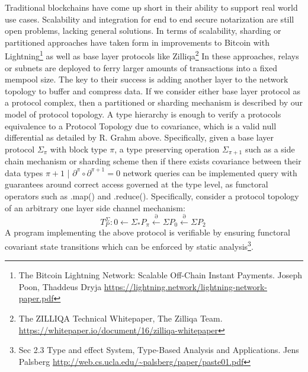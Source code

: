 \documentclass{article}
\begin{document}
Traditional blockchains have come up short in their ability to support real world use cases. Scalability and integration for end to end secure notarization are still open problems, lacking general solutions. In terms of scalability, sharding or partitioned approaches have taken form in improvements to Bitcoin with Lightning\footnote{The Bitcoin Lightning Network:
Scalable Off-Chain Instant Payments. Joseph Poon, Thaddeus Dryja \url{https://lightning.network/lightning-network-paper.pdf}} as well as base layer protocols like Zilliqa\footnote{The ZILLIQA Technical Whitepaper, The Zilliqa Team. \url{https://whitepaper.io/document/16/zilliqa-whitepaper}} In these approaches, relays or subnets are deployed to ferry larger amounts of transactions into a fixed mempool size. The key to their success is adding another layer to the network topology to buffer and compress data. If we consider either base layer protocol as a protocol complex, then a partitioned or sharding mechanism is described by our model of protocol topology. A type hierarchy is enough to verify a protocols equivalence to a Protocol Topology due to covariance, which is a valid null differential as detailed by R. Grahm above. Specifically, given a base layer protocol $\Sigma_\pi$ with block type $\pi$, a type preserving operation $\Sigma_{\pi+1}$ such as a side chain mechanism or sharding scheme then if there exists covariance between their data types $\pi+1$ | $\partial^\pi \circ \partial^{\pi+1} = 0$ network queries can be implemented query with guarantees around correct access governed at the type level, as functoral operators such as .map() and .reduce(). Specifically, consider a protocol topology of an arbitrary one layer side channel mechanism:
\begin{equation} \label{eq1}
T^{\Sigma}_P: 0 \leftarrow \Sigma_{*}P_\pi \xleftarrow{\partial} \Sigma P_{0} \xleftarrow{\partial} \Sigma P_2 \ 
\end{equation} \label{eq1}
A program implementing the above protocol is verifiable by ensuring functoral covariant state transitions which can be enforced by static analysis\footnote{Sec 2.3 Type and effect System, Type-Based Analysis and Applications. Jens Palsberg \url{http://web.cs.ucla.edu/~palsberg/paper/paste01.pdf}}.
\end{document}
